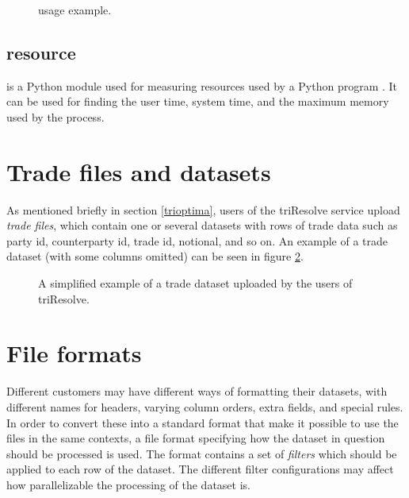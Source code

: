 \begin{figure}[ht]
  \centering
  \caption{ usage example.}
  \label{fig:profiler_example}
\end{figure}

\subsection{resource}
 is a Python module used for measuring resources used by a Python program \cite{36_3rruip2d}. It can be used for finding the user time, system time,
and the maximum memory used by the process.

\section{Trade files and datasets}
As mentioned briefly in section \ref{trioptima}, users of the triResolve service upload \textit{trade files}, which contain one or several datasets with
rows of trade data such as party id, counterparty id, trade id, notional, and so on. An example of a trade dataset (with some columns omitted) can be seen in figure
\ref{fig:data_set_example}.

\begin{figure}[ht]
\centering
{}
\caption[Example of trade dataset]{A simplified example of a trade dataset uploaded by the users of triResolve.}
  \label{fig:data_set_example}
\end{figure}

\section{File formats}
Different customers may have different ways of formatting their datasets, with different names for headers, varying column orders, extra fields,
and special rules. In order to convert these into a standard format that make it possible to use the files in the same contexts, a file format specifying
how the dataset in question should be processed is used. The format contains a set of \textit{filters} which should be applied to each row of the dataset.
The different filter configurations may affect how parallelizable the processing of the dataset is.

